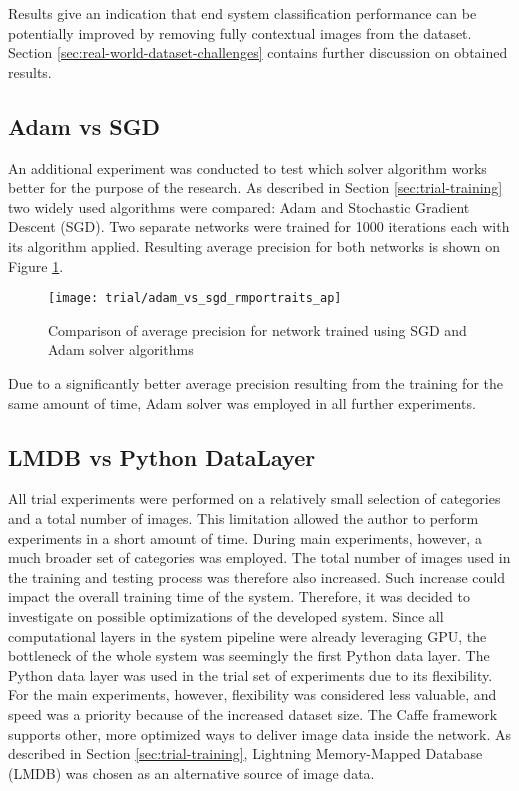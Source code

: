     
    Results give an indication that end system classification performance can be potentially improved by removing fully contextual images from the dataset. Section \ref{sec:real-world-dataset-challenges} contains further discussion on obtained results.

    
\subsection{Adam vs SGD}
    An additional experiment was conducted to test which solver algorithm works better for the purpose of the research. As described in Section \ref{sec:trial-training} two widely used algorithms were compared: Adam and Stochastic Gradient Descent (SGD). Two separate networks were trained for 1000 iterations each with its algorithm applied. Resulting average precision for both networks is shown on Figure \ref{fig:trial-sgd-vs-adam}.

    \begin{figure}[H]
        \centering
        \texttt{[image: trial/adam\_vs\_sgd\_rmportraits\_ap]}
        \caption[Trial experiment. Average precision for Adam vs SGD solvers]{Comparison of average precision for network trained using SGD and Adam solver algorithms}
        \label{fig:trial-sgd-vs-adam}
    \end{figure}
    
    Due to a significantly better average precision resulting from the training for the same amount of time, Adam solver was employed in all further experiments.
    
    
\subsection{LMDB vs Python DataLayer}
    All trial experiments were performed on a relatively small selection of categories and a total number of images. This limitation allowed the author to perform experiments in a short amount of time. During main experiments, however, a much broader set of categories was employed. The total number of images used in the training and testing process was therefore also increased. Such increase could impact the overall training time of the system. Therefore, it was decided to investigate on possible optimizations of the developed system. Since all computational layers in the system pipeline were already leveraging GPU, the bottleneck of the whole system was seemingly the first Python data layer. The Python data layer was used in the trial set of experiments due to its flexibility. For the main experiments, however, flexibility was considered less valuable, and speed was a priority because of the increased dataset size. The Caffe framework supports other, more optimized ways to deliver image data inside the network. As described in Section \ref{sec:trial-training}, Lightning Memory-Mapped Database (LMDB) was chosen as an alternative source of image data.
    
